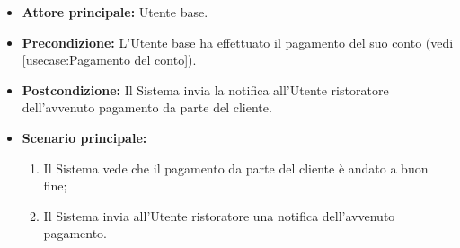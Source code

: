 \label{usecase:Notifica avvenuto pagamento}
\begin{itemize}
	\item \textbf{Attore principale:} Utente base.
	
	\item \textbf{Precondizione:} L'Utente base ha effettuato il pagamento del suo conto (vedi \autoref{usecase:Pagamento del conto}).

    
	\item \textbf{Postcondizione:} Il Sistema invia la notifica all'Utente ristoratore dell'avvenuto pagamento da parte del cliente.
     
	\item \textbf{Scenario principale:}
	      \begin{enumerate}
                \item Il Sistema vede che il pagamento da parte del cliente è andato a buon fine;
                \item Il Sistema invia all'Utente ristoratore una notifica dell'avvenuto pagamento.
	      \end{enumerate}
\end{itemize}